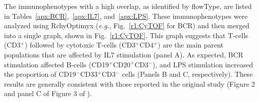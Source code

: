 The immunophenotypes with a high overlap, as identified by flowType, are listed in Tables~\ref{apx:BCR},~\ref{apx:IL7}, and~\ref{apx:LPS}.
These immunophenotypes were analyzed using RchyOptimyx (\emph{e.g.}, Fig.~\ref{r1:CyTOF} for BCR) and then merged into a single graph, shown in Fig.~\ref{r1:CyTOF}.
This graph suggests that T-cells (CD3$^+$) followed by cytotoxic T-cells (CD3$^+$CD4$^+$) are the main parent populations that are affected by IL7 stimulation (panel A).
As expected, BCR stimulation affected B-cells (CD19$^+$CD20$^+$CD3$^-$), and LPS stimulation increased the proportion of CD19$^-$CD33$^+$CD3$^-$ cells (Panels B and C, respectively).
These results are generally consistent with those reported in the original study (Figure 2 and panel C of Figure 3 of \cite{bendall2011single}).

